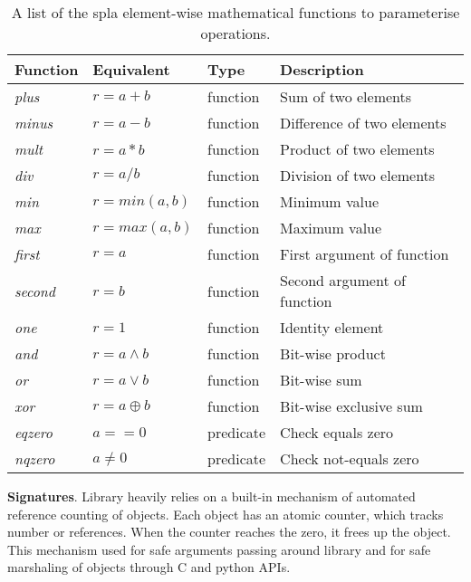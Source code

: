 \begin{table}[tbp]
\caption{A list of the spla element-wise mathematical functions to parameterise operations.}
\begin{center}
    \begin{tabular}{|l|l|l|l|}
    \hline
    \textbf{Function} & \textbf{Equivalent} & \textbf{Type} & \textbf{Description} \\ \hline
    \hline
    \textit{plus}   & $r = a + b$ & function & Sum of two elements \\ \hline
    \textit{minus}  & $r = a - b$ & function & Difference of two elements \\ \hline
    \textit{mult}   & $r = a * b$ & function & Product of two elements \\ \hline
    \textit{div}    & $r = a / b$ & function & Division of two elements \\ \hline
    \hline
    \textit{min}    & $r = min(a, b)$ & function & Minimum value \\ \hline
    \textit{max}    & $r = max(a, b)$ & function & Maximum value \\ \hline
    \hline
    \textit{first}  & $r = a$ & function & First argument of function \\ \hline
    \textit{second} & $r = b$ & function & Second argument of function \\ \hline
    \textit{one}    & $r = 1$ & function & Identity element \\ \hline
    \hline
    \textit{and}    & $r = a \land b$  & function & Bit-wise product \\ \hline
    \textit{or}     & $r = a \lor b$   & function & Bit-wise sum\\ \hline
    \textit{xor}    & $r = a \oplus b$ & function  & Bit-wise exclusive sum \\ \hline
    \hline
    \textit{eqzero} & $a == 0$  & predicate & Check equals zero \\ \hline
    \textit{nqzero} & $a\neq 0$ & predicate & Check not-equals zero \\ \hline
    \end{tabular}
    \label{tab:ewise}
\end{center}
\end{table}

\textbf{Signatures}. Library heavily relies on a built-in mechanism of automated reference counting of objects. Each object has an atomic counter, which tracks number or references. When the counter reaches the zero, it frees up the object. This mechanism used for safe arguments passing around library and for safe marshaling of objects through C and python APIs.

